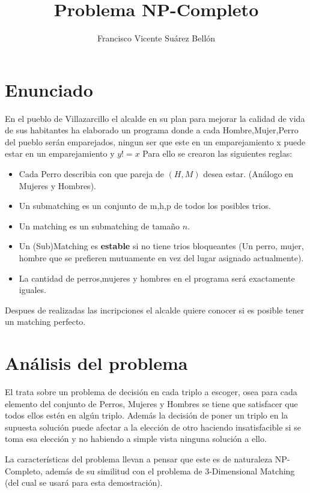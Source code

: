\documentclass{article}
\title{Problema NP-Completo}
\author{Francisco Vicente Suárez Bellón}
\date{}
\begin{document}
\maketitle
\section{Enunciado}
En el pueblo de Villazarcillo el alcalde en su plan para mejorar la 
calidad de vida de sus habitantes ha elaborado un programa donde a cada Hombre,Mujer,Perro
del pueblo serán emparejados, ningun ser que este en un emparejamiento x puede estar en un emparejamiento y $y!=x$
Para ello se crearon las siguientes reglas:
\begin{itemize}
    \item Cada Perro describia con que pareja de $(H,M)$ desea estar. (Análogo en Mujeres y Hombres).
    \item Un submatching es un conjunto de m,h,p de todos los posibles trios.
    \item Un matching es un submatching de tamaño $n$.
    \item Un (Sub)Matching es \textbf{estable} si no tiene trios bloqueantes (Un perro, mujer, hombre que se prefieren mutuamente en vez del lugar asignado actualmente).
    \item La cantidad de perros,mujeres y hombres en el programa será exactamente iguales.
\end{itemize}
Despues de realizadas las incripciones el alcalde quiere conocer si es posible tener un matching perfecto.
\section*{Análisis del problema}
El trata sobre un problema de decisión en cada triplo a escoger, osea para cada elemento del conjunto de Perros, Mujeres y Hombres 
se tiene que satisfacer que todos ellos estén en algún triplo. Además la decisión de poner un triplo en la supuesta solución puede
afectar a la elección  de otro haciendo insatisfacible si se toma esa elección y no habiendo a simple vista ninguna solución a ello.

La características del problema llevan a pensar que este es de naturaleza NP-Completo, además de su similitud con el 
problema de 3-Dimensional Matching (del cual se usará para esta demostración).
\end{document}
